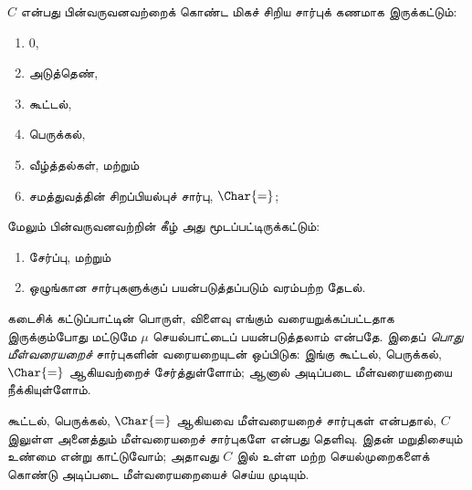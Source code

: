 \documentclass[../../../include/open-logic-section]{subfiles}
\begin{document}

$C$ என்பது பின்வருவனவற்றைக் கொண்ட மிகச் சிறிய சார்புக் கணமாக இருக்கட்டும்:
\begin{enumerate}
\item $0$,
\item அடுத்தெண்,
\item கூட்டல்,
\item பெருக்கல்,
\item வீழ்த்தல்கள், மற்றும்
\item சமத்துவத்தின் சிறப்பியல்புச் சார்பு, $\Char{=}$;
\end{enumerate}
மேலும் பின்வருவனவற்றின் கீழ் அது மூடப்பட்டிருக்கட்டும்:
\begin{enumerate}
\item சேர்ப்பு, மற்றும்
\item ஒழுங்கான சார்புகளுக்குப் பயன்படுத்தப்படும் வரம்பற்ற தேடல்.
\end{enumerate}

கடைசிக் கட்டுப்பாட்டின் பொருள், விளைவு எங்கும் வரையறுக்கப்பட்டதாக
இருக்கும்போது மட்டுமே $\mu$ செயல்பாட்டைப் பயன்படுத்தலாம் என்பதே.
இதைப் \emph{பொது மீள்வரையறைச்} சார்புகளின் வரையறையுடன் ஒப்பிடுக:
இங்கு கூட்டல், பெருக்கல், $\Char{=}$ ஆகியவற்றைச் சேர்த்துள்ளோம்;
ஆனால் அடிப்படை மீள்வரையறையை நீக்கியுள்ளோம்.

கூட்டல், பெருக்கல், $\Char{=}$ ஆகியவை மீள்வரையறைச் சார்புகள் என்பதால்,
$C$ இலுள்ள அனைத்தும் மீள்வரையறைச் சார்புகளே என்பது தெளிவு.
இதன் மறுதிசையும் உண்மை என்று காட்டுவோம்; அதாவது $C$ இல் உள்ள மற்ற
செயல்முறைகளைக் கொண்டு அடிப்படை மீள்வரையறையைச் செய்ய முடியும்.
\end{document}
